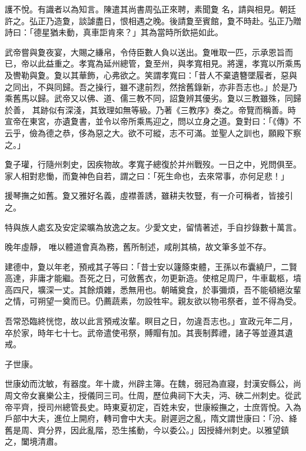 \begin{pinyinscope}
 護不悅。有識者以為知言。陳遣其尚書周弘正來聘，素聞夐
 名，請與相見。朝廷許之。弘正乃造夐，談謔盡日，恨相遇之晚。後請夐至賓館，夐不時赴。弘正乃贈詩曰：「德星猶未動，真車詎肯來？」其為當時所欽挹如此。



 武帝嘗與夐夜宴，大賜之縑帛，令侍臣數人負以送出。夐唯取一匹，示承恩旨而已，帝以此益重之。孝寬為延州總管，夐至州，與孝寬相見。將還，孝寬以所乘馬及轡勒與夐。夐以其華飾，心弗欲之。笑謂孝寬曰：「昔人不棄遺簪墜履者，惡與之同出，不與同歸。吾之操行，雖不逮前烈，然捨舊錄新，亦非吾志也。」於是乃乘舊馬以歸。武帝又以佛、道、儒三教不同，詔夐辨其優劣。夐以三教雖殊，同歸於善，
 其跡似有深淺，其致理如無等級。乃著《三教序》奏之。帝覽而稱善。時宣帝在東宮，亦遺夐書，並令以帝所乘馬迎之，問以立身之道。夐對曰：「《傳》不云乎，儉為德之恭，侈為惡之大。欲不可縱，志不可滿。並聖人之訓也，願殿下察之。」



 夐子瓘，行隨州刺史，因疾物故。孝寬子總復於并州戰歿。一日之中，兇問俱至。家人相對悲慟，而夐神色自若，謂之曰：「死生命也，去來常事，亦何足悲！」



 援琴撫之如舊。夐又雅好名義，虛襟善誘，雖耕夫牧豎，有一介可稱者，皆接引之。



 特與族人處玄及安定梁曠為放逸之友。少愛文史，留情著述，手自抄錄數十萬言。



 晚年虛靜，
 唯以體道會真為務，舊所制述，咸削其槁，故文筆多並不存。



 建德中，夐以年老，預戒其子等曰：「昔士安以籧篨束體，王孫以布囊繞尸，二賢高達，非庸才能繼。吾死之日，可斂舊衣，勿更新造。使棺足周尸，牛車載柩，墳高四尺，壙深一丈。其餘煩雜，悉無用也。朝晡奠食，於事彌煩，吾不能頓絕汝輩之情，可朔望一奠而已。仍薦蔬素，勿設牲牢。親友欲以物弔祭者，並不得為受。



 吾常恐臨終恍惚，故以此言預戒汝輩。瞑目之日，勿違吾志也。」宣政元年二月，卒於家，時年七十七。武帝遣使弔祭，賻賵有加。其喪制葬禮，諸子等並遵其遺戒。



 子世康。



 世康幼而沈敏，有器度。年十歲，州辟主簿。在魏，弱冠為直寢，封漢安縣公，尚周文帝女襄樂公主，授儀同三司。仕周，歷位典祠下大夫，沔、硤二州刺史。從武帝平齊，授司州總管長史。時東夏初定，百姓未安，世康綏撫之，士庶胥悅。入為戶部中大夫，進位上開府，轉司會中大夫。尉遲迥之亂，隋文謂世康曰：「汾、絳舊是周、齊分界，因此亂階，恐生搖動，今以委公。」因授絳州刺史。以雅望鎮之，闔境清肅。




\end{pinyinscope}
